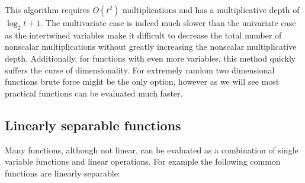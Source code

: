 \documentclass{article}
\begin{document}
        This algorithm requires $O(t^2)$ multiplications and has a multiplicative depth of
        $\log_2 t + 1$.
        The multivariate case is indeed much slower than the univariate case as the intertwined variables make it difficult
        to decrease the total number of nonscalar multiplications without greatly 
        increasing the nonscalar multiplicative depth.
        Additionally, for functions with even more variables, this method quickly suffers the curse of dimensionality.
        For extremely random two dimensional functions
        brute force might be the only option,
        however as we will see most practical functions can be evaluated much faster.

    \subsection{Linearly separable functions}
        Many functions, although not linear, can be evaluated as a combination of single variable functions and linear operations.
        For example the following common functions are linearly separable:
\end{document}

